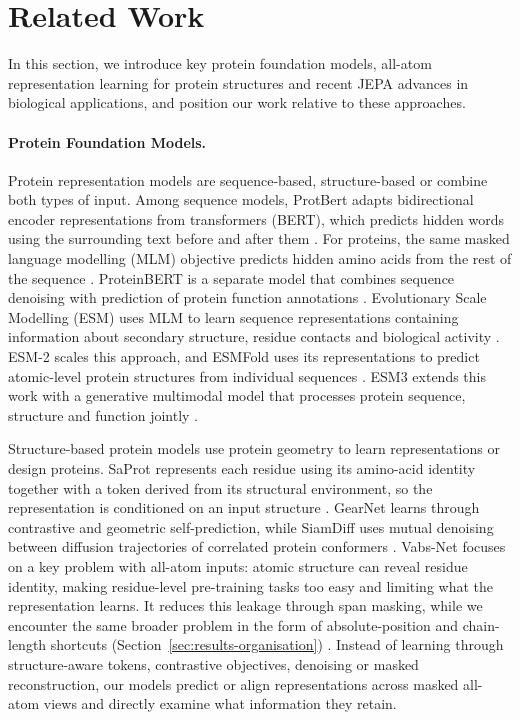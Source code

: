 \section{Related Work}
\label{sec:related-work}

In this section, we introduce key protein foundation models, all-atom representation learning for protein structures and recent JEPA advances in biological applications, and position our work relative to these approaches.

\paragraph{Protein Foundation Models.}
\label{sec:related-work-foundation-models}
Protein representation models are sequence-based, structure-based or combine both types of input.
Among sequence models, ProtBert adapts bidirectional encoder representations from transformers (BERT), which predicts hidden words using the surrounding text before and after them \citep{devlin2019bert}.
For proteins, the same masked language modelling (MLM) objective predicts hidden amino acids from the rest of the sequence \citep{DBLP:journals/pami/ElnaggarHDRWJGF22}.
ProteinBERT is a separate model that combines sequence denoising with prediction of protein function annotations \citep{brandes2022proteinbert}.
Evolutionary Scale Modelling (ESM) uses MLM to learn sequence representations containing information about secondary structure, residue contacts and biological activity \citep{rives2019esm}.
ESM-2 scales this approach, and ESMFold uses its representations to predict atomic-level protein structures from individual sequences \citep{lin2023esmfold}.
ESM3 extends this work with a generative multimodal model that processes protein sequence, structure and function jointly \citep{hayes2025esm3}.

Structure-based protein models use protein geometry to learn representations or design proteins.
SaProt represents each residue using its amino-acid identity together with a token derived from its structural environment, so the representation is conditioned on an input structure \citep{DBLP:conf/iclr/SuHZSZY24}.
GearNet learns through contrastive and geometric self-prediction, while SiamDiff uses mutual denoising between diffusion trajectories of correlated protein conformers \citep{zhang2023protein,zhang2023siamdiff}. Vabs-Net focuses on a key problem with all-atom inputs: atomic structure can reveal residue identity, making residue-level pre-training tasks too easy and limiting what the representation learns. It reduces this leakage through span masking, while we encounter the same broader problem in the form of absolute-position and chain-length shortcuts (Section~\ref{sec:results-organisation}) \citep{DBLP:conf/icml/ZhaoZSLL24}. Instead of learning through structure-aware tokens, contrastive objectives, denoising or masked reconstruction, our models predict or align representations across masked all-atom views and directly examine what information they retain.

